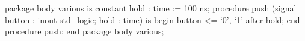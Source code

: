 package body various is
    constant hold : time := 100 ns;
    procedure push (signal button : inout std_logic; hold : time) is
    begin
        button <= `0', `1' after hold;
    end procedure push;
end package body various;